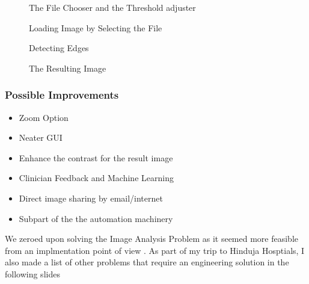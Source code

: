 \documentclass{beamer}
\begin{document}
\begin{frame}[allowframebreaks]
\begin{figure}[!h]
    \begin{center}
    \end{center}
    		\caption{The File Chooser and the Threshold adjuster}
\end{figure}

\begin{figure}[!h]
    \begin{center}
    \end{center}
    		\caption{Loading Image by Selecting the File}
\end{figure}


\begin{figure}[!h]
    \begin{center}
    \end{center}
    		\caption{Detecting Edges }
\end{figure}


\begin{figure}[!h]
    \begin{center}
    \end{center}
    		\caption{The Resulting Image }
\end{figure}

\end{frame}

\begin{frame}
\frametitle{Possible Improvements}
    \begin{itemize}
	\item Zoom Option
	\item Neater GUI
	\item Enhance the contrast for the result image
	\item Clinician Feedback and Machine Learning
	\item  Direct image sharing by email/internet
	\item Subpart of the the automation machinery
	
	

    \end{itemize}
        
\end{frame}




\begin{frame}
\center
We zeroed upon solving the Image Analysis Problem as it seemed more feasible  from an implmentation point of view . 
As part of my trip  to Hinduja Hosptials,  I also made a list of other problems that require an engineering solution in the following slides
\end{frame}
\end{document}
